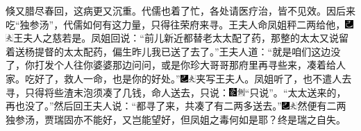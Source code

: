 倏又腊尽春回，这病更又沉重。代儒也着了忙，各处请医疗治，皆不见效。因后来吃``独参汤''，代儒如何有这力量，只得往荣府来寻。王夫人命凤姐秤二两给他，{\includegraphics[width=3mm]{../Images/00003}\includegraphics[width=3mm]{../Images/00012}\footnotesize \kaishu 王夫人之慈若是。}凤姐回说：``前儿新近都替老太太配了药，那整的太太又说留着送杨提督的太太配药，偏生昨儿我已送了去了。''王夫人道：``就是咱们这边没了，你打发个人往你婆婆那边问问，或是你珍大哥哥那府里再寻些来，凑着给人家。吃好了，救人一命，也是你的好处。''{\includegraphics[width=3mm]{../Images/00003}\includegraphics[width=3mm]{../Images/00012}\footnotesize \kaishu 夹写王夫人。}凤姐听了，也不遣人去寻，只得将些渣末泡须凑了几钱，命人送去，只说：{\includegraphics[width=3mm]{../Images/00006}\includegraphics[width=3mm]{../Images/00011}\footnotesize \kaishu ``只说''。}``太太送来的，再也没了。''然后回王夫人说：``都寻了来，共凑了有二两多送去。''{\includegraphics[width=3mm]{../Images/00003}\includegraphics[width=3mm]{../Images/00012}\footnotesize \kaishu 然便有二两独参汤，贾瑞固亦不能好，又岂能望好，但凤姐之毒何如是耶？终是瑞之自失。}

